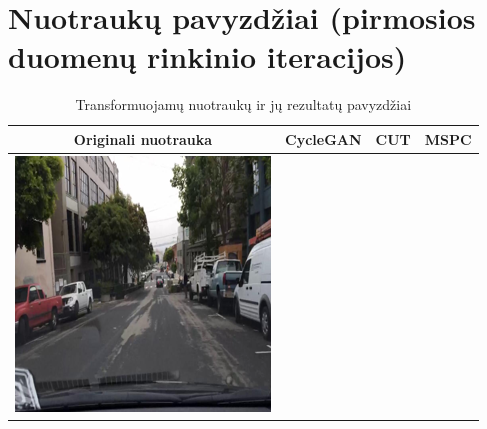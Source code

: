\documentclass{VUMIFPSkursinis}
\begin{document}
    \section{Nuotraukų pavyzdžiai (pirmosios duomenų rinkinio iteracijos)}
        \begin{table}[H]
            \footnotesize
            \centering
            \caption{Transformuojamų nuotraukų ir jų rezultatų pavyzdžiai}
            {\begin{tabular}{|c|c|c|c|} \hline
                Originali nuotrauka & CycleGAN  & CUT  & MSPC\\
                \hline
                \includegraphics[scale=0.35]{img/pvz/1_real} & 

\end{tabular}}
\end{table}
\end{document}

